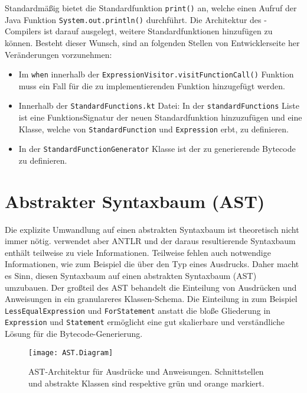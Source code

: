 Standardmäßig bietet \toya die Standardfunktion \texttt{print()} an, welche einen Aufruf der Java Funktion \texttt{System.out.println()} durchführt. Die Architektur des \toya-Compilers ist darauf ausgelegt, weitere Standardfunktionen hinzufügen zu können. Besteht dieser Wunsch, sind an folgenden Stellen von Entwicklerseite her Veränderungen vorzunehmen:

\begin{itemize}
    \item Im \texttt{when} innerhalb der \texttt{ExpressionVisitor.visitFunctionCall()} Funktion muss ein Fall für die zu implementierenden Funktion hinzugefügt werden.
    \item Innerhalb der \texttt{StandardFunctions.kt} Datei: In der \texttt{standardFunctions} Liste ist eine FunktionsSignatur der neuen Standardfunktion hinzuzufügen und eine Klasse, welche von \texttt{StandardFunction} und \texttt{Expression} erbt, zu definieren.
    \item In der \texttt{StandardFunctionGenerator} Klasse ist der zu generierende Bytecode zu definieren.
\end{itemize}

\section{Abstrakter Syntaxbaum (AST)}

Die explizite Umwandlung auf einen abstrakten Syntaxbaum ist theoretisch nicht immer nötig. \toya verwendet aber ANTLR und der daraus resultierende Syntaxbaum enthält teilweise zu viele Informationen. Teilweise fehlen auch notwendige Informationen, wie zum Beispiel die über den Typ eines Ausdrucks. Daher macht es Sinn, diesen Syntaxbaum auf einen abstrakten Syntaxbaum (AST) umzubauen. Der großteil des AST behandelt die Einteilung von Ausdrücken und Anweisungen in ein granulareres Klassen-Schema. Die Einteilung in zum Beispiel \texttt{LessEqualExpression} und \texttt{ForStatement} anstatt die bloße Gliederung in \texttt{Expression} und \texttt{Statement} ermöglicht eine gut skalierbare und verständliche Lösung für die Bytecode-Generierung. 

\begin{figure}
    \caption{AST-Architektur für Ausdrücke und Anweisungen. Schnittstellen und abstrakte Klassen sind respektive grün und orange markiert.}
    \centering
    \texttt{[image: AST.Diagram]}
    \label{fig:ast-architecture}
\end{figure}

